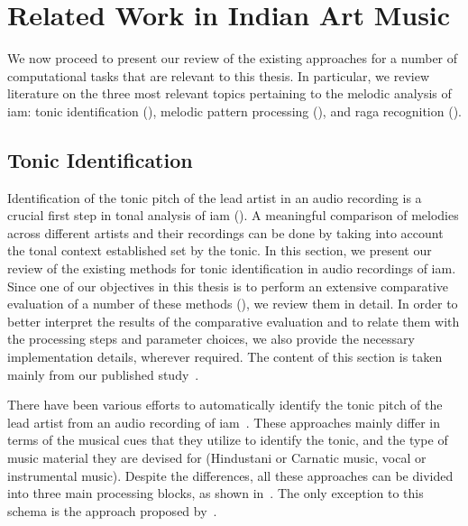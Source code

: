 \section{Related Work in Indian Art Music}
\label{sec:background_relevant_work_iam}

We now proceed to present our review of the existing approaches for a number of computational tasks that are relevant to this thesis. In particular, we review literature on the three most relevant topics pertaining to the melodic analysis of \gls{iam}: tonic identification (), melodic pattern processing (), and \gls{raga} recognition (). 


\subsection{Tonic Identification}
\label{sec:background_relevant_work_tonic_identification}

Identification of the tonic pitch of the lead artist in an audio recording is a crucial first step in tonal analysis of \gls{iam} (). A meaningful comparison of melodies across different artists and their recordings can be done by taking into account the tonal context established set by the tonic. In this section, we present our review of the existing methods for tonic identification in audio recordings of \gls{iam}. Since one of our objectives in this thesis is to perform an extensive comparative evaluation of a number of these methods (), we review them in detail. In order to better interpret the results of the comparative evaluation and to relate them with the processing steps and parameter choices, we also provide the necessary implementation details, wherever required. The content of this section is taken mainly from our published study~\citep{Gulati2014Tonic}.

There have been various efforts to automatically identify the tonic pitch of the lead artist from an audio recording of \gls{iam}~\citep{salamon2012multipitch,gulati2012two,bellur2012knowledge,ranjani2011carnatic,Sengupta2005b,chordia2013joint}. These approaches mainly differ in terms of the musical cues that they utilize to identify the tonic, and the type of music material they are devised for (Hindustani or Carnatic music, vocal or
instrumental music). Despite the differences, all these approaches can be divided into three main processing blocks, as shown in~. The only exception to this schema is the approach proposed by~\cite{Sengupta2005b}. 

